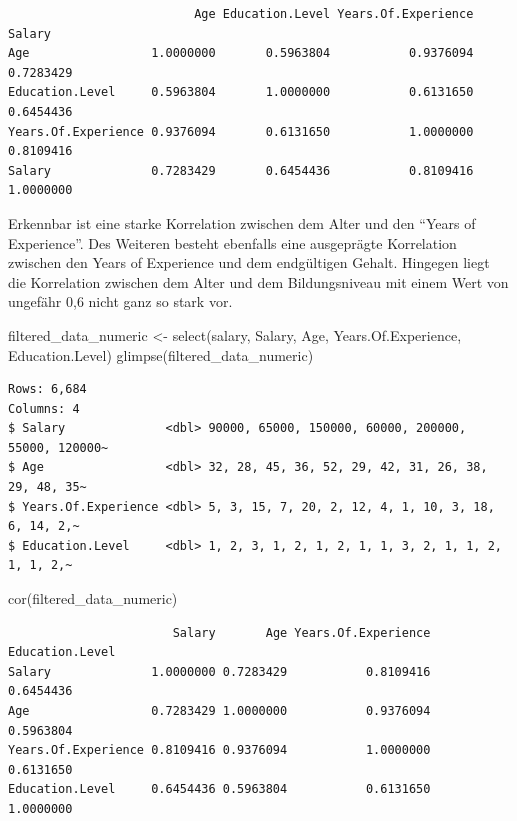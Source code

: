 \documentclass[
  letterpaper,
  DIV=11,
  numbers=noendperiod]{scrartcl}
\newenvironment{Shaded}{\begin{snugshade}}{\end{snugshade}}
\newcommand{\FunctionTok}[1]{\textcolor[rgb]{0.28,0.35,0.67}{#1}}
\newcommand{\NormalTok}[1]{\textcolor[rgb]{0.00,0.23,0.31}{#1}}
\newcommand{\OtherTok}[1]{\textcolor[rgb]{0.00,0.23,0.31}{#1}}
\begin{document}
\begin{verbatim}
                          Age Education.Level Years.Of.Experience    Salary
Age                 1.0000000       0.5963804           0.9376094 0.7283429
Education.Level     0.5963804       1.0000000           0.6131650 0.6454436
Years.Of.Experience 0.9376094       0.6131650           1.0000000 0.8109416
Salary              0.7283429       0.6454436           0.8109416 1.0000000
\end{verbatim}

Erkennbar ist eine starke Korrelation zwischen dem Alter und den ``Years
of Experience''. Des Weiteren besteht ebenfalls eine ausgeprägte
Korrelation zwischen den Years of Experience und dem endgültigen Gehalt.
Hingegen liegt die Korrelation zwischen dem Alter und dem Bildungsniveau
mit einem Wert von ungefähr 0,6 nicht ganz so stark vor.

\begin{Shaded}
\begin{Highlighting}[]
\NormalTok{filtered\_data\_numeric }\OtherTok{\textless{}{-}} \FunctionTok{select}\NormalTok{(salary, Salary, Age, Years.Of.Experience, Education.Level)}
\FunctionTok{glimpse}\NormalTok{(filtered\_data\_numeric)}
\end{Highlighting}
\end{Shaded}

\begin{verbatim}
Rows: 6,684
Columns: 4
$ Salary              <dbl> 90000, 65000, 150000, 60000, 200000, 55000, 120000~
$ Age                 <dbl> 32, 28, 45, 36, 52, 29, 42, 31, 26, 38, 29, 48, 35~
$ Years.Of.Experience <dbl> 5, 3, 15, 7, 20, 2, 12, 4, 1, 10, 3, 18, 6, 14, 2,~
$ Education.Level     <dbl> 1, 2, 3, 1, 2, 1, 2, 1, 1, 3, 2, 1, 1, 2, 1, 1, 2,~
\end{verbatim}

\begin{Shaded}
\begin{Highlighting}[]
\FunctionTok{cor}\NormalTok{(filtered\_data\_numeric)}
\end{Highlighting}
\end{Shaded}

\begin{verbatim}
                       Salary       Age Years.Of.Experience Education.Level
Salary              1.0000000 0.7283429           0.8109416       0.6454436
Age                 0.7283429 1.0000000           0.9376094       0.5963804
Years.Of.Experience 0.8109416 0.9376094           1.0000000       0.6131650
Education.Level     0.6454436 0.5963804           0.6131650       1.0000000
\end{verbatim}
\end{document}
